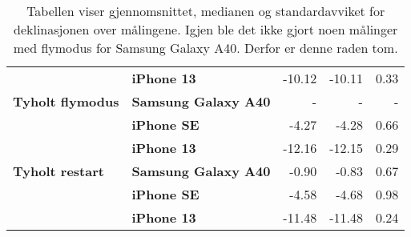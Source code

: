 \begin{table}[]
\begin{tabular}{llrrr}
                                            & \textbf{iPhone 13}                      & -10.12                                                                      & -10.11                                                                & 0.33                                                                         \\
    \textbf{Tyholt flymodus}                & \textbf{Samsung Galaxy A40}                       & -                                                                           & -                                                                     & -                                                                            \\
                                            & \textbf{iPhone SE}                   & -4.27                                                                       & -4.28                                                                 & 0.66                                                                         \\
                                            & \textbf{iPhone 13}                      & -12.16                                                                      & -12.15                                                                & 0.29                                                                         \\
    \rowcolor[HTML]{C0C0C0} 
    \textbf{Tyholt restart}                 & \textbf{Samsung Galaxy A40}                       & -0.90                                                                       & -0.83                                                                 & 0.67                                                                         \\
    \rowcolor[HTML]{C0C0C0} 
                                            & \textbf{iPhone SE}                   & -4.58                                                                       & -4.68                                                                 & 0.98                                                                         \\
    \rowcolor[HTML]{C0C0C0} 
                                            & \textbf{iPhone 13}                      & -11.48                                                                      & -11.48                                                                & 0.24                                                                        
    \end{tabular}
    \caption{Tabellen viser gjennomsnittet, medianen og standardavviket for deklinasjonen over målingene. Igjen ble det ikke gjort noen målinger med flymodus for Samsung Galaxy A40. Derfor er denne raden tom.}
\end{table}